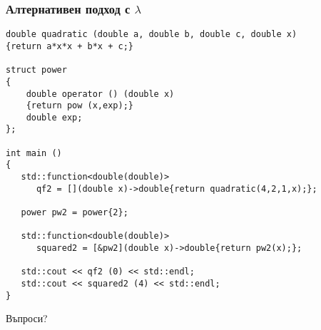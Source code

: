 \documentclass{beamer}
\begin{document}
\begin{frame}[fragile]
    \frametitle{Алтернативен подход с $\lambda$}
    
\begin{lstlisting}[basicstyle=\tiny]
double quadratic (double a, double b, double c, double x)
{return a*x*x + b*x + c;}

struct power
{
    double operator () (double x)
    {return pow (x,exp);}
    double exp;
};

int main ()
{
   std::function<double(double)> 
      qf2 = [](double x)->double{return quadratic(4,2,1,x);};

   power pw2 = power{2};

   std::function<double(double)> 
      squared2 = [&pw2](double x)->double{return pw2(x);};

   std::cout << qf2 (0) << std::endl;
   std::cout << squared2 (4) << std::endl;
}
\end{lstlisting}
\end{frame}



\begin{frame}
\centerline{Въпроси?}
\end{frame}
\end{document}
